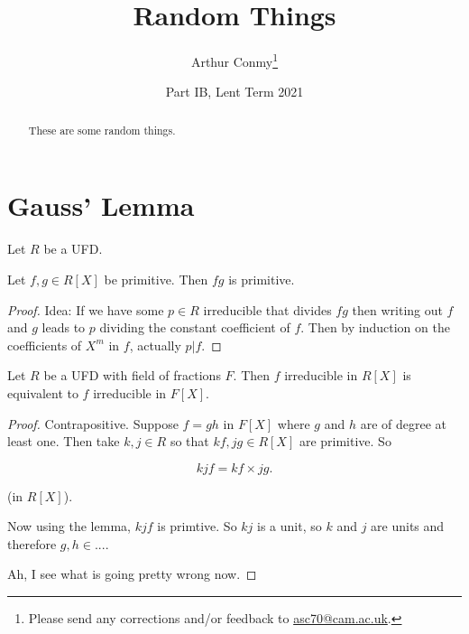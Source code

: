 \documentclass[11pt]{scrartcl}
\begin{document}
\title{Random Things}
\author{Arthur Conmy\footnote{Please send any corrections and/or feedback to \url{asc70@cam.ac.uk}.}}
\date{Part IB, Lent Term 2021}

\maketitle
\begin{abstract}
These are some random things.
\end{abstract}

\tableofcontents %

\section{Gauss' Lemma}

\begin{lemma}
    Let $R$ be a UFD.

    Let $f, g \in R[X]$ be primitive. Then $fg$ is primitive.

    \begin{proof}
        Idea: If we have some $p \in R$ irreducible that divides $fg$ then writing out $f$ and $g$ leads to $p$ dividing the constant coefficient of $f$. Then by induction on the coefficients of $X^m$ in $f$, actually $p|f$.
    \end{proof}
\end{lemma}

\begin{theorem}

    Let $R$ be a UFD with field of fractions $F$. Then $f$ irreducible in $R[X]$ is equivalent to $f$ irreducible in $F[X]$. 

    \begin{proof}
        Contrapositive. Suppose $f = gh$ in $F[X]$ where $g$ and $h$ are of degree at least one. Then take $k, j \in R$ so that $kf, jg \in R[X]$ are primitive. So 

        \begin{equation}
            kjf = kf \times jg.
        \end{equation}

        (in $R[X]$).

        Now using the lemma, $kjf$ is primtive. So $kj$ is a unit, so $k$ and $j$ are units and therefore $g, h \in ... $.
        
        Ah, I see what is going pretty wrong now.
    \end{proof}
\end{theorem}
\end{document}
